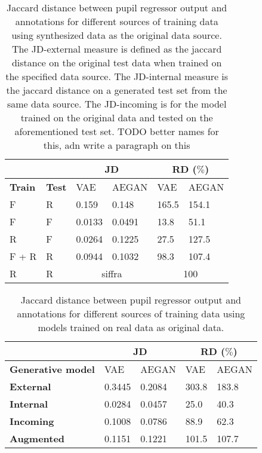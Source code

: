 \begin{table}[t]
    \centering
    \caption{Jaccard distance between pupil regressor output and annotations for different sources of training data using synthesized data as the original data source. The JD-external measure is defined as the jaccard distance on the original test data when trained on the specified data source. The JD-internal measure is the jaccard distance on a generated test set from the same data source. The JD-incoming is for the model trained on the original data and tested on the aforementioned test set. TODO better names for this, adn write a paragraph on this}
    \label{tab:quantitative_results}
    \begin{tabular}{|ll|ll|ll|}
        \cline{3-6}
        \multicolumn{2}{c}{ } & \multicolumn{2}{|c|}{JD} & \multicolumn{2}{c|}{RD ($\%$)} \\ \hline
        \textbf{Train} & \textbf{Test} & VAE & AEGAN & VAE & AEGAN \\ \hline
        F & R & 0.159  & 0.148 & 165.5 & 154.1 \\
        F & F & 0.0133 & 0.0491 & 13.8 & 51.1 \\ 
        R & F & 0.0264 & 0.1225 & 27.5 & 127.5 \\ 
        F + R & R & 0.0944 & 0.1032 & 98.3 & 107.4 \\ 
        \hline
        R & R & \multicolumn{2}{c|}{siffra} & \multicolumn{2}{c|}{100} \\
        \hline
    \end{tabular}
\end{table}

\begin{table}[t]
    \centering
    \caption{Jaccard distance between pupil regressor output and annotations for different sources of training data using models trained on real data as original data.}
    \label{tab:quantitative_results}
    \begin{tabular}{|l|ll|ll|}
        \cline{2-5}
        \multicolumn{1}{c}{ } & \multicolumn{2}{|c|}{JD} & \multicolumn{2}{c|}{RD ($\%$)} \\ \hline
        \textbf{Generative model} & VAE & AEGAN & VAE & AEGAN \\ \hline
        \textbf{External} & 0.3445 & 0.2084 & 303.8 & 183.8 \\
        \textbf{Internal} & 0.0284 & 0.0457 & 25.0 & 40.3 \\ 
        \textbf{Incoming} & 0.1008 & 0.0786 & 88.9 & 62.3 \\ 
        \textbf{Augmented} & 0.1151 & 0.1221  & 101.5 & 107.7 \\ 
        \hline
    \end{tabular}
\end{table}

